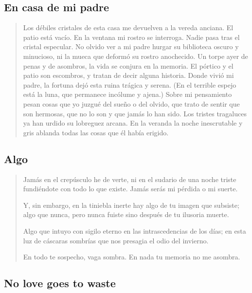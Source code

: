 \documentclass[a4paper, 12pt]{article}
\begin{document}
\pagebreak
\subsection{En casa de mi padre}

\begin{verse}
   Los débiles cristales de esta casa 
   me devuelven a la vereda anciana.
   El patio está vacío. En la ventana 
   mi rostro se interroga. Nadie pasa 
   tras el cristal especular. No olvido 
   ver a mi padre hurgar su biblioteca
   oscuro y minucioso, ni la mueca 
   que deformó su rostro anochecido.
   Un torpe ayer de penas y de asombros,
   la vida se conjura en la memoria.
   El pórtico y el patio son escombros,
   y tratan de decir alguna historia.
   Donde vivió mi padre, la fortuna 
   dejó esta ruina trágica y serena.
   (En el terrible espejo está la luna,
   que permanece incólume y ajena.)
   Sobre mi pensamiento pesan cosas 
   que yo juzgué del sueño o del olvido,
   que trato de sentir que son hermosas,
   que no lo son y que jamás lo han sido.
   Los tristes tragaluces ya han urdido
   su lobreguez arcana. En la veranda 
   la noche inescrutable y gris ablanda 
   todas las cosas que él había erigido.
\end{verse}

\pagebreak
\subsection{Algo}

\begin{verse}
    
Jamás en el crepúsculo he de verte,
ni en el sudario de una noche triste
fundiéndote con todo lo que existe.
Jamás serás mi pérdida o mi suerte.
~ 

Y, sin embargo, en la tiniebla inerte
hay algo de tu imagen que subsiste;
algo que nunca, pero nunca fuiste 
sino después de tu ilusoria muerte.
~ 

Algo que intuyo con sigilo eterno
en las intrascedencias de los días;
en esta luz de cáscaras sombrías
que nos presagia el odio del invierno.
~ 

En todo te sospecho, vaga sombra.
En nada tu memoria no me asombra.


\end{verse}

\pagebreak
\subsection{No love goes to waste}
~ 
\end{document}
